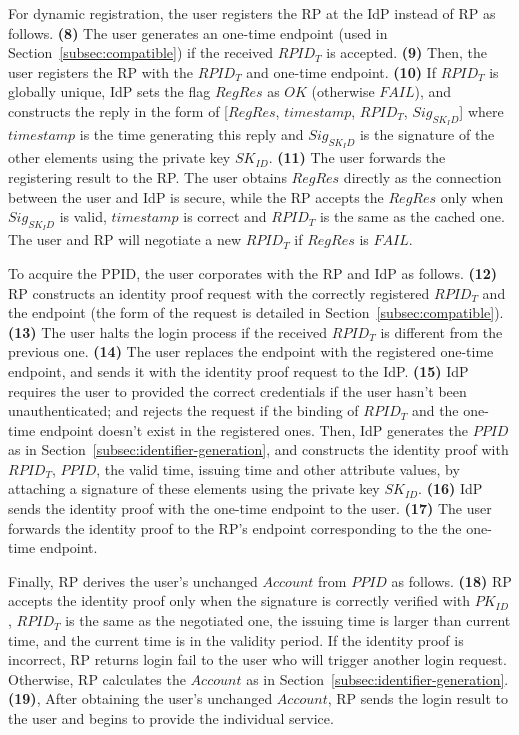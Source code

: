 For dynamic registration, the user registers the RP at the IdP instead of RP as follows. \textbf{(8)} The user generates an one-time endpoint (used in Section~\ref{subsec:compatible}) if the received $RPID_T$ is accepted. \textbf{(9)} Then, the user registers the RP with the $RPID_T$ and one-time endpoint. \textbf{(10)} If $RPID_T$ is globally unique, IdP sets the flag $RegRes$ as $OK$ (otherwise $FAIL$), and constructs the reply in the form of [$RegRes$, $timestamp$, $RPID_T$, $Sig_{SK_ID}$] where $timestamp$ is the time generating this reply and $Sig_{SK_ID}$ is the signature of the other elements using the private key $SK_{ID}$. \textbf{(11)} The user forwards the registering result to the RP. The user obtains $RegRes$ directly as the connection between the user and IdP is secure, while the RP accepts the $RegRes$ only when $Sig_{SK_ID}$ is valid, $timestamp$ is correct and $RPID_T$ is the same as the cached one. The user and RP will negotiate a new $RPID_T$ if $RegRes$ is $FAIL$.

To acquire the PPID, the user corporates with the RP and IdP as follows. \textbf{(12)} RP constructs an identity proof request with the correctly registered $RPID_T$ and the endpoint (the form of the request is detailed in Section~\ref{subsec:compatible}). \textbf{(13)} The user halts the login process if the received $RPID_T$ is different from the previous one. \textbf{(14)} The user replaces the endpoint with the registered one-time endpoint, and sends it with the identity proof request to the IdP. \textbf{(15)} IdP requires the user to provided the correct credentials if the user hasn't been unauthenticated; and rejects the request if the binding of $RPID_T$ and the one-time endpoint doesn't exist in the registered ones. Then, IdP generates the $PPID$ as in Section~\ref{subsec:identifier-generation}, and constructs the identity proof with $RPID_T$, $PPID$, the valid time, issuing time and other attribute values, by attaching a signature of these elements using the private key $SK_{ID}$. \textbf{(16)} IdP sends the identity proof with the one-time endpoint to the user. \textbf{(17)} The user forwards the identity proof to the RP's endpoint corresponding to the the one-time endpoint.

Finally, RP derives the user's unchanged $Account$ from $PPID$ as follows. \textbf{(18)} RP accepts the identity proof only when the signature is correctly verified with $PK_{ID}$, $RPID_T$ is the same as the negotiated one, the issuing time is larger than current time, and the current time is in the validity period. If the identity proof is incorrect, RP returns login fail to the user who will trigger another login request. Otherwise, RP calculates the $Account$ as in Section~\ref{subsec:identifier-generation}. \textbf{(19)}, After obtaining the user's unchanged $Account$, RP sends the login result to the user and begins to provide the individual service.


